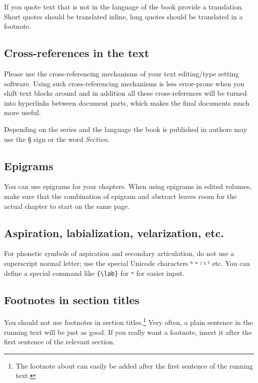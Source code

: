 {If you quote text that is not in the language of the book provide a translation. Short quotes should
be translated inline, long quotes should be translated in a footnote.




\subsection{Cross-references in the text}

Please use the cross-referencing mechanisms of your text editing/type setting software. Using such
cross-referencing mechanisms is less error-prone when you shift text blocks around and in addition
all these cross-references will be turned into hyperlinks between document parts, which makes the
final documents much more useful.


 
Depending on the series and the language the book is published in authors may  use the § sign or the word \emph{Section}. 

\subsection{Epigrams}
You can use epigrams for your chapters. When using epigrams in edited volumes, make sure that the combination of epigram and abstract leaves room for the actual chapter to start on the same page.

\subsection{Aspiration, labialization, velarization, etc.}
For phonetic symbols of aspiration and secondary articulation, do not use a superscript normal letter; use the special Unicode characters ʰ ʷ ʲ ˠ ˤ etc. You can define a special command like \verb+{\lab}+ for ʷ for easier input. 

\subsection{Footnotes in section titles}\label{sec:footnote}
You should not use footnotes in section titles.\footnote{The footnote about  can easily be added after the first sentence of the running text.} Very often, a plain sentence in the running text will be just as good. If you really want a footnote, insert it after the first sentence of the relevant section.

}
